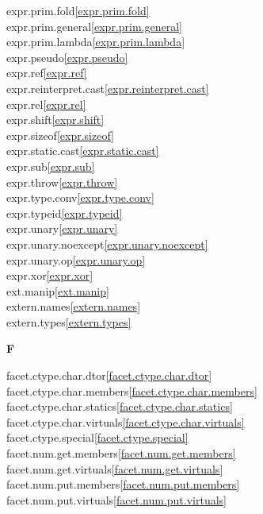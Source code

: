 \begin{multicols}{2}
expr.prim.fold\quad\ref{expr.prim.fold}\\
expr.prim.general\quad\ref{expr.prim.general}\\
expr.prim.lambda\quad\ref{expr.prim.lambda}\\
expr.pseudo\quad\ref{expr.pseudo}\\
expr.ref\quad\ref{expr.ref}\\
expr.reinterpret.cast\quad\ref{expr.reinterpret.cast}\\
expr.rel\quad\ref{expr.rel}\\
expr.shift\quad\ref{expr.shift}\\
expr.sizeof\quad\ref{expr.sizeof}\\
expr.static.cast\quad\ref{expr.static.cast}\\
expr.sub\quad\ref{expr.sub}\\
expr.throw\quad\ref{expr.throw}\\
expr.type.conv\quad\ref{expr.type.conv}\\
expr.typeid\quad\ref{expr.typeid}\\
expr.unary\quad\ref{expr.unary}\\
expr.unary.noexcept\quad\ref{expr.unary.noexcept}\\
expr.unary.op\quad\ref{expr.unary.op}\\
expr.xor\quad\ref{expr.xor}\\
ext.manip\quad\ref{ext.manip}\\
extern.names\quad\ref{extern.names}\\
extern.types\quad\ref{extern.types}\\
\par \textbf{F}\par
facet.ctype.char.dtor\quad\ref{facet.ctype.char.dtor}\\
facet.ctype.char.members\quad\ref{facet.ctype.char.members}\\
facet.ctype.char.statics\quad\ref{facet.ctype.char.statics}\\
facet.ctype.char.virtuals\quad\ref{facet.ctype.char.virtuals}\\
facet.ctype.special\quad\ref{facet.ctype.special}\\
facet.num.get.members\quad\ref{facet.num.get.members}\\
facet.num.get.virtuals\quad\ref{facet.num.get.virtuals}\\
facet.num.put.members\quad\ref{facet.num.put.members}\\
facet.num.put.virtuals\quad\ref{facet.num.put.virtuals}\\

\end{multicols}
